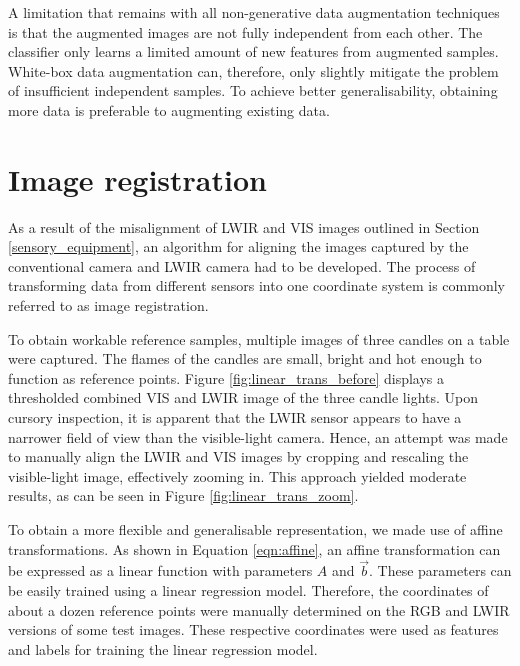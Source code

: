 \documentclass{l4proj}
\begin{document}
A limitation that remains with all non-generative data augmentation techniques is that the augmented images are not fully independent from each other. The classifier only learns a limited amount of new features from augmented samples. White-box data augmentation can, therefore, only slightly mitigate the problem of insufficient independent samples. To achieve better generalisability, obtaining more data is preferable to augmenting existing data.


\section{Image registration}
\label{image_registration}

As a result of the misalignment of LWIR and VIS images outlined in Section \ref{sensory_equipment}, an algorithm for aligning the images captured by the conventional camera and LWIR camera had to be developed. The process of transforming data from different sensors into one coordinate system is commonly referred to as image registration.

To obtain workable reference samples, multiple images of three candles on a table were captured. The flames of the candles are small, bright and hot enough to function as reference points. Figure \ref{fig:linear_trans_before} displays a thresholded combined VIS and LWIR image of the three candle lights. Upon cursory inspection, it is apparent that the LWIR sensor appears to have a narrower field of view than the visible-light camera. Hence, an attempt was made to manually align the LWIR and VIS images by cropping and rescaling the visible-light image, effectively zooming in. This approach yielded moderate results, as can be seen in Figure \ref{fig:linear_trans_zoom}.

To obtain a more flexible and generalisable representation, we made use of affine transformations. As shown in Equation \ref{eqn:affine}, an affine transformation can be expressed as a linear function with parameters $A$ and $\vec{b}$. These parameters can be easily trained using a linear regression model. Therefore, the coordinates of about a dozen reference points were manually determined on the RGB and LWIR versions of some test images. These respective coordinates were used as features and labels for training the linear regression model. 
\end{document}
